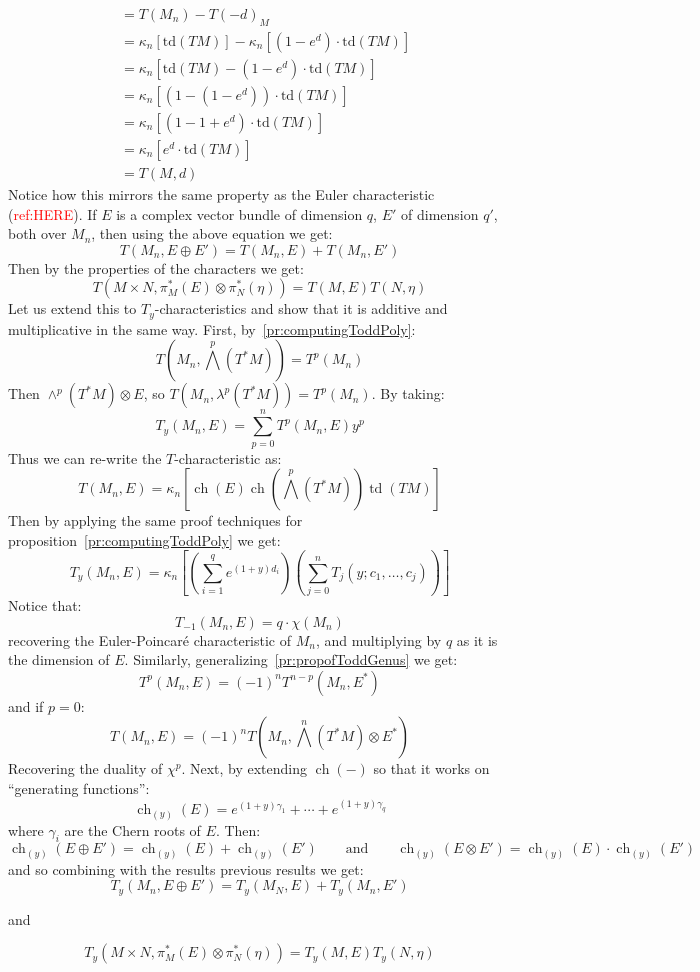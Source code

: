 \documentclass{book}
\newcommand{\ch}{{\operatorname{ch}}}
\newcommand{\td}{{\operatorname{td}}}
\begin{document}
\begin{align*} &= T(M_n) - T(-d)_M \\ &= \kappa_n[\text{td}(TM)] - \kappa_n[(1 - e^d) \cdot \text{td}(TM)] \\
&= \kappa_n[\text{td}(TM) - (1 - e^d) \cdot \text{td}(TM)] \\ &= \kappa_n[\left(1 - (1 - e^d)\right) \cdot
\text{td}(TM)] \\ &= \kappa_n[\left(1 - 1 + e^d\right) \cdot \text{td}(TM)] \\ &= \kappa_n[e^d \cdot
\text{td}(TM)]\\
&= T(M, d)
\end{align*}
Notice how this mirrors the same property as the Euler characteristic (\textcolor{red}{ref:HERE}). If $E$ is a complex
vector bundle of dimension $q$, $E'$ of dimension $q'$, both over $M_n$, then using the
above equation we get:
\[
  T(M_n, E\oplus E') = T(M_n, E) + T(M_n, E')
\]
Then by the properties of the characters we get:
\[
  T(M\times N, \pi_M^*(E)\otimes \pi_N^*(\eta)) = T(M,E)T(N, \eta)
\]
Let us extend this to $T_y$-characteristics and show that it is additive and multiplicative in the same way.
First, by~\cref{pr:computingToddPoly}:
\[
  T \left(M_n, \bigwedge^p(T^*M)\right) = T^p(M_n)
\]
Then $\wedge^p(T^*M)\otimes E$, so $T(M_n, \lambda^p(T^*M)) = T^p(M_n)$. By taking:
\[
  T_y(M_n, E) = \sum_{p=0}^n T^p(M_n, E)y^p
\]
Thus we can re-write the $T$-characteristic as:
 \[
   T(M_n,E) = \kappa_n \left[\ch(E)\ch\left(\bigwedge^p(T^*M)\right) \td(TM)\right]
 \]
 Then by applying the same proof techniques for proposition~\cref{pr:computingToddPoly} we get:
\[
  T_y(M_n, E) = \kappa_n \left[\left(\sum_{i=1}^q e^{(1+y)d_i}\right)\left(\sum_{j=0}^n T_j(y;c_1,\ldots,c_j)\right)\right]
\]
Notice that:
\[
  T_{-1}(M_n, E) = q\cdot\chi(M_n)
\]
recovering the Euler-Poincar\'e characteristic of $M_n$, and multiplying by $q$ as it is the dimension of $E$.
Similarly, generalizing~\cref{pr:propofToddGenus} we get:
\[
  T^p(M_n, E) = (-1)^n T^{n-p}(M_n, E^*)
\]
and if $p  =0$:
\[
  T(M_n, E) = (-1)^n T\left(M_n, \bigwedge^n(T^*M)\otimes E^*\right)
\]
Recovering the duality of $\chi^p$. Next, by extending $\ch(-)$ so that it works on ``generating  functions'':
  \[
    \ch_{(y)}(E) = e^{(1+y)\gamma_1} + \cdots + e^{(1+y)\gamma_q}
  \]
where $\gamma_i$ are the Chern roots of $E$. Then:
\[
  \ch_{(y)}(E\oplus E') = \ch_{(y)}(E) + \ch_{(y)}(E') \qquad \text{and} \qquad \ch_{(y)}(E\otimes E')
  = \ch_{(y)}(E)\cdot \ch_{(y)}(E')
\]
and so combining with the results previous results we get:
\[
  T_y(M_n, E\oplus E') = T_y(M_N, E) + T_y(M_n, E')
\]
\begin{center}
  and
\end{center}
\[
  T_y(M\times N, \pi_M^*(E)\otimes \pi_N^*(\eta)) = T_y(M, E)T_y(N, \eta)
\]
\end{document}
